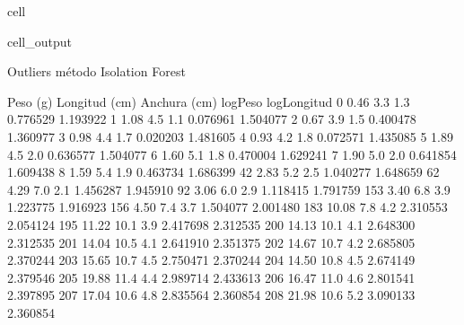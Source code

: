 \documentclass[a4paper,10pt,spanish]{jupyterBook}
\begin{document}
\begin{sphinxuseclass}{cell}
\begin{sphinxVerbatimOutput}
\begin{sphinxuseclass}{cell_output}
\begin{sphinxVerbatim}[commandchars=\\\{\}]
Outliers método Isolation Forest
\end{sphinxVerbatim}

\begin{sphinxVerbatim}[commandchars=\\\{\}]
     Peso (g)  Longitud (cm)  Anchura (cm)  log\PYGZus{}Peso  log\PYGZus{}Longitud  \PYGZbs{}
0        0.46            3.3           1.3 \PYGZhy{}0.776529      1.193922
1        1.08            4.5           1.1  0.076961      1.504077
2        0.67            3.9           1.5 \PYGZhy{}0.400478      1.360977
3        0.98            4.4           1.7 \PYGZhy{}0.020203      1.481605
4        0.93            4.2           1.8 \PYGZhy{}0.072571      1.435085
5        1.89            4.5           2.0  0.636577      1.504077
6        1.60            5.1           1.8  0.470004      1.629241
7        1.90            5.0           2.0  0.641854      1.609438
8        1.59            5.4           1.9  0.463734      1.686399
42       2.83            5.2           2.5  1.040277      1.648659
62       4.29            7.0           2.1  1.456287      1.945910
92       3.06            6.0           2.9  1.118415      1.791759
153      3.40            6.8           3.9  1.223775      1.916923
156      4.50            7.4           3.7  1.504077      2.001480
183     10.08            7.8           4.2  2.310553      2.054124
195     11.22           10.1           3.9  2.417698      2.312535
200     14.13           10.1           4.1  2.648300      2.312535
201     14.04           10.5           4.1  2.641910      2.351375
202     14.67           10.7           4.2  2.685805      2.370244
203     15.65           10.7           4.5  2.750471      2.370244
204     14.50           10.8           4.5  2.674149      2.379546
205     19.88           11.4           4.4  2.989714      2.433613
206     16.47           11.0           4.6  2.801541      2.397895
207     17.04           10.6           4.8  2.835564      2.360854
208     21.98           10.6           5.2  3.090133      2.360854


\end{sphinxVerbatim}
\end{sphinxuseclass}
\end{sphinxVerbatimOutput}
\end{sphinxuseclass}
\end{document}
